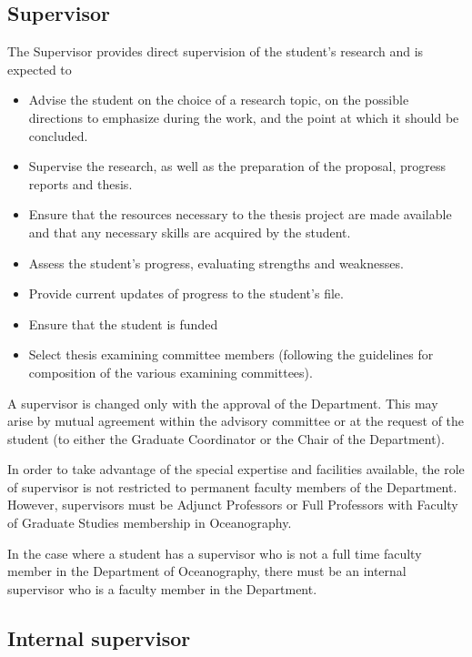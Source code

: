\documentclass{article}
\begin{document}
\subsection{Supervisor}

The Supervisor provides direct supervision of the student's research and is expected to
\begin{itemize}
\item Advise the student on the choice of a research topic, on the possible directions to emphasize during the work, and the point at which it should be concluded.
\item Supervise the research, as well as the preparation of the proposal, progress reports and thesis.
\item Ensure that the resources necessary to the thesis project are made available and that any necessary skills are acquired by the student.
\item Assess the student's progress, evaluating strengths and weaknesses.
\item Provide current updates of progress to the student's file.
\item Ensure that the student is funded
\item Select thesis examining committee members (following the guidelines for composition of the various examining committees).
\end{itemize}

A supervisor is changed only with the approval of the Department. This may
arise by mutual agreement within the advisory committee or at the request of
the student (to either the Graduate Coordinator or the Chair of the
Department).

In order to take advantage of the special expertise and facilities available,
the role of supervisor is not restricted to permanent faculty members of the
Department. However, supervisors must be Adjunct Professors or Full Professors
with Faculty of Graduate Studies membership in Oceanography.

In the case where a student has a supervisor who is not a full time faculty
member in the Department of Oceanography, there must be an internal supervisor
who is a faculty member in the Department.

\subsection{Internal supervisor}
\end{document}
